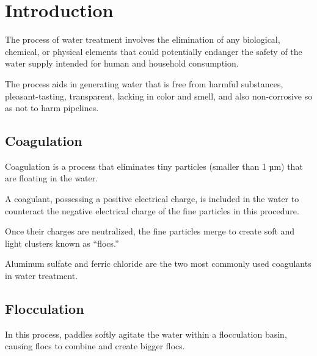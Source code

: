 \section{Introduction}

The process of water treatment involves the elimination of any biological,
chemical, or physical elements that could potentially endanger the safety of the
water supply intended for human and household consumption.

The process aids in generating water that is free from harmful substances,
pleasant-tasting, transparent, lacking in color and smell, and also
non-corrosive so as not to harm pipelines. \cite{TheConstructor}

\subsection{Coagulation}

Coagulation is a process that eliminates tiny particles (smaller than 1 µm) that
are floating in the water.

A coagulant, possessing a positive electrical charge, is included in the water
to counteract the negative electrical charge of the fine particles in this
procedure.

Once their charges are neutralized, the fine particles merge to create soft and
light clusters known as ``flocs.''

Aluminum sulfate and ferric chloride are the two most commonly used coagulants
in water treatment.

\subsection{Flocculation}

In this process, paddles softly agitate the water within a flocculation basin,
causing flocs to combine and create bigger flocs.
